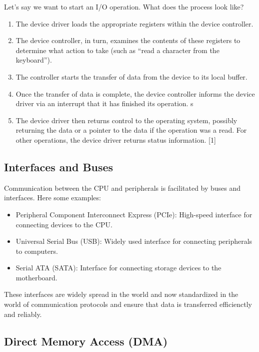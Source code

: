 \documentclass[a4paper]{article}
\begin{document}
\noindent
Let's say we want to start an I/O operation. What does the process look like?

\begin{enumerate}
    \item The device driver loads the appropriate registers
    within the device controller.
    \item The device controller, in turn, examines the
    contents of these registers to determine what action to take (such as “read
    a character from the keyboard”).
    \item The controller starts the transfer of data from
    the device to its local buffer. 
    \item Once the transfer of data is complete, the device
    controller informs the device driver via an interrupt that it has finished its
    operation. s
    \item The device driver then returns control to the operating system,
    possibly returning the data or a pointer to the data if the operation was a read.
    For other operations, the device driver returns status information. [1]
\end{enumerate}

\subsection{Interfaces and Buses}

Communication between the CPU and peripherals is facilitated by buses and interfaces. Here some examples:

\begin{itemize}
    \item Peripheral Component Interconnect Express (PCIe): High-speed interface for connecting devices to the CPU.
    \item Universal Serial Bus (USB): Widely used interface for connecting peripherals to computers.
    \item Serial ATA (SATA): Interface for connecting storage devices to the motherboard.
\end{itemize}
These interfaces are widely spread in the world and now standardized in the world of communication protocols and ensure that data is transferred efficienctly and reliably.

\subsection{Direct Memory Access (DMA)}
\end{document}
